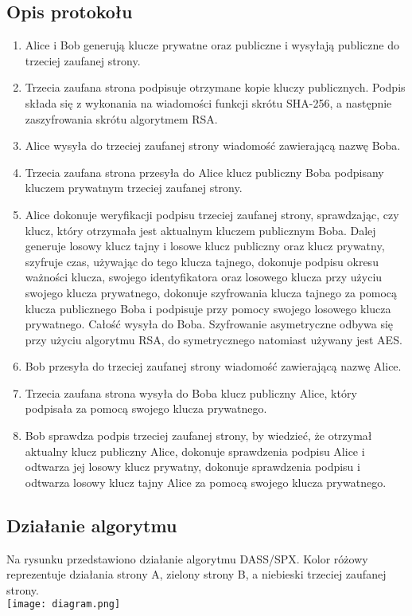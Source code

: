\documentclass[11pt]{article}
\begin{document}
\subsection{Opis protokołu}
\begin{enumerate}
\item Alice i Bob generują klucze prywatne oraz publiczne i wysyłają publiczne do trzeciej zaufanej strony.
\item Trzecia zaufana strona podpisuje otrzymane kopie kluczy publicznych. Podpis składa się z wykonania na wiadomości funkcji skrótu SHA-256, a następnie zaszyfrowania skrótu algorytmem RSA.
\item Alice wysyła do trzeciej zaufanej strony wiadomość zawierającą nazwę Boba.
\item Trzecia zaufana strona przesyła do Alice klucz publiczny Boba podpisany kluczem prywatnym trzeciej zaufanej strony.
\item Alice dokonuje weryfikacji podpisu trzeciej zaufanej strony, sprawdzając, czy klucz, który otrzymała jest aktualnym kluczem publicznym Boba. Dalej generuje losowy klucz tajny i losowe klucz publiczny oraz klucz prywatny, szyfruje czas, używając do tego klucza tajnego, dokonuje podpisu okresu ważności klucza, swojego identyfikatora oraz losowego klucza przy użyciu swojego klucza prywatnego, dokonuje szyfrowania klucza tajnego za pomocą klucza publicznego Boba i podpisuje przy pomocy swojego losowego klucza prywatnego. Całość wysyła do Boba. Szyfrowanie asymetryczne odbywa się przy użyciu algorytmu RSA, do symetrycznego natomiast używany jest AES.
\item Bob przesyła do trzeciej zaufanej strony wiadomość zawierającą nazwę Alice.
\item Trzecia zaufana strona wysyła do Boba klucz publiczny Alice, który podpisała za pomocą swojego klucza prywatnego.
\item Bob sprawdza podpis trzeciej zaufanej strony, by wiedzieć, że otrzymał aktualny klucz publiczny Alice, dokonuje sprawdzenia podpisu Alice i odtwarza jej losowy klucz prywatny, dokonuje sprawdzenia podpisu i odtwarza losowy klucz tajny Alice za pomocą swojego klucza prywatnego.
\end{enumerate}
\clearpage
\subsection{Działanie algorytmu}
Na rysunku przedstawiono działanie algorytmu DASS/SPX. Kolor różowy reprezentuje działania strony A, zielony strony B, a niebieski trzeciej zaufanej strony.\\
\texttt{[image: diagram.png]}
\end{document}
